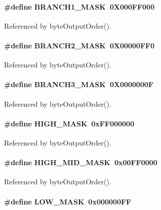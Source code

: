 \paragraph[{BRANCH1\_\-MASK}]{\setlength{\rightskip}{0pt plus 5cm}\#define BRANCH1\_\-MASK~0X000FF000}\hfill\label{vppg_8c_a5b6e9acd081992eb4d9221a38bc9fec9}


Referenced by byteOutputOrder().
\paragraph[{BRANCH2\_\-MASK}]{\setlength{\rightskip}{0pt plus 5cm}\#define BRANCH2\_\-MASK~0X00000FF0}\hfill\label{vppg_8c_a592e6b6c2d5a836aa01062d488493f47}


Referenced by byteOutputOrder().
\paragraph[{BRANCH3\_\-MASK}]{\setlength{\rightskip}{0pt plus 5cm}\#define BRANCH3\_\-MASK~0X0000000F}\hfill\label{vppg_8c_a4988cd2c9cd3017c0d38fdc9970c31b0}


Referenced by byteOutputOrder().
\paragraph[{HIGH\_\-MASK}]{\setlength{\rightskip}{0pt plus 5cm}\#define HIGH\_\-MASK~0xFF000000}\hfill\label{vppg_8c_af08cb0539416eda126f2917de413ad02}


Referenced by byteOutputOrder().
\paragraph[{HIGH\_\-MID\_\-MASK}]{\setlength{\rightskip}{0pt plus 5cm}\#define HIGH\_\-MID\_\-MASK~0x00FF0000}\hfill\label{vppg_8c_af08d854fe89e14fb166404564703ba37}


Referenced by byteOutputOrder().
\paragraph[{LOW\_\-MASK}]{\setlength{\rightskip}{0pt plus 5cm}\#define LOW\_\-MASK~0x000000FF}\hfill\label{vppg_8c_ac7403e47bec3751551a923fe35a71761}


